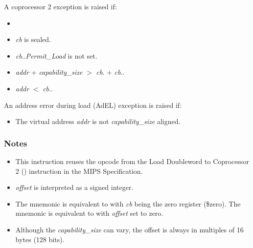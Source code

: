 A coprocessor 2 exception is raised if:

\begin{itemize}
\item
\cchecktag{}
\item
\emph{cb} is sealed.
\item
\emph{cb}.\cperms.\emph{Permit\_Load} is not set.
\item
\emph{addr} + \emph{capability\_size} $>$ \emph{cb}.\cbase{} $+$ \emph{cb}.\clength{}.
\item
\emph{addr} $<$ \emph{cb}.\cbase{}.
\end{itemize}


An address error during load (AdEL) exception is raised if:

\begin{itemize}
\item
The virtual address \emph{addr} is not \emph{capability\_size} aligned.
\end{itemize}

\subsubsection*{Notes}

\begin{itemize}
\item
This instruction reuses the opcode from the Load Doubleword to Coprocessor 2
() instruction in the MIPS Specification.
\item
\emph{offset} is interpreted as a signed integer.
\item
The  mnemonic is equivalent to  with
\emph{cb} being the zero register (\$zero). The  mnemonic
is equivalent to  with \emph{offset} set to
zero.
\item
Although the \emph{capability\_size} can vary, the offset is always in
multiples of 16 bytes (128 bits).
\end{itemize}
